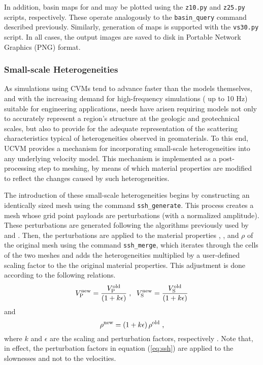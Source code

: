 In addition, basin maps for  and  may be plotted using the \texttt{z10.py} and \texttt{z25.py} scripts, respectively. These operate analogously to the \texttt{basin\_query} command described previously. Similarly, generation of \vsthirty{} maps is supported with the \texttt{vs30.py} script. In all cases, the output images are saved to disk in Portable Network Graphics (PNG) format.

\subsubsection{Small-scale Heterogeneities}

As simulations using CVMs tend to advance faster than the models themselves, and with the increasing demand for high-frequency simulations (\fmax{} up to 10 Hz) suitable for engineering applications, needs have arisen requiring models not only to accurately represent a region's structure at the geologic and geotechnical scales, but also to provide for the adequate representation of the scattering characteristics typical of heterogeneities observed in geomaterials. To this end, UCVM provides a mechanism for incorporating small-scale heterogeneities into any underlying velocity model. This mechanism is implemented as a post-processing step to meshing, by means of which material properties are modified to reflect the changes caused by such heterogeneities.

The introduction of these small-scale heterogeneities begins by constructing an identically sized mesh using the command \texttt{ssh\_generate}. This process creates a mesh whose grid point payloads are perturbations (with a normalized amplitude). These perturbations are generated following the algorithms previously used by \citet{Withers_2013_SCEC} and \citet{Savran_2014_SSA}. Then, the perturbations are applied to the material properties \vp{}, \vs{}, and $\rho$ of the original mesh using the command \texttt{ssh\_merge}, which iterates through the cells of the two meshes and adds the heterogeneities multiplied by a user-defined scaling factor to the the original material properties. This adjustment is done according to the following relations.
%
\begin{equation}
\label{eq:ssh}
	V_{\mathrm{P}}^{\mathrm{new}} = \frac{ V_{\mathrm{P}}^{\mathrm{old}} }{ (1 + k \epsilon) }
	\hspace{0.3em},
	\hspace{0.6em}
	V_{\mathrm{S}}^{\mathrm{new}} = \frac{ V_{\mathrm{S}}^{\mathrm{old}} }{ (1 + k \epsilon) }
\end{equation}
%
and
%
\begin{equation}
	\rho^{\mathrm{new}} = (1 + k \epsilon) \, \rho^{\mathrm{old}}
	\hspace{0.3em},
\end{equation}
%
where $k$ and $\epsilon$ are the scaling and perturbation factors, respectively \citep[see][]{Withers_2013_SCEC, Savran_2014_SSA}. Note that, in effect, the perturbation factors in equation (\ref{eq:ssh}) are applied to the slownesses and not to the velocities.


